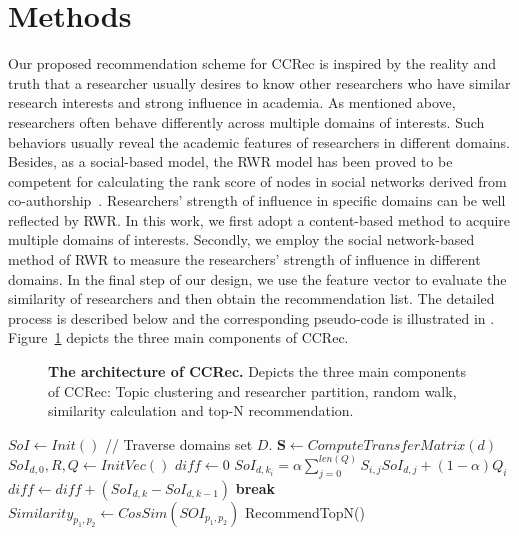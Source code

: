 \documentclass[10pt,letterpaper]{article}
\newcommand{\algorithmicbreak}{\textbf{break}}
\newcommand{\BREAK}{\State \algorithmicbreak}
\begin{document}
\section*{Methods}
Our proposed recommendation scheme for CCRec is inspired by the reality and truth that a researcher usually desires to know other researchers who have similar research interests and strong influence in academia. As mentioned above, researchers often behave differently across multiple domains of interests. Such behaviors usually reveal the academic features of researchers in different domains. Besides, as a social-based model, the RWR model has been proved to be competent for calculating the rank score of nodes in social networks derived from co-authorship~\cite{li2014acrec}. Researchers' strength of influence in specific domains can be well reflected by RWR. In this work, we first adopt a content-based method to acquire multiple domains of interests. Secondly, we employ the social network-based method of RWR to measure the researchers' strength of influence in different domains. In the final step of our design, we use the feature vector to evaluate the similarity of researchers and then obtain the recommendation list. The detailed process is described below and the corresponding pseudo-code is illustrated in . Figure~\ref{Fig. 1} depicts the three main components of CCRec.

\begin{figure}[!hbt]
\caption{{\bf The architecture of CCRec.} Depicts the three main components of CCRec: Topic clustering and researcher partition, random walk, similarity calculation and top-N recommendation.}
\label{Fig. 1}
\end{figure}

\begin{algorithm}[!hbt]
  \label{Algorithm1}
  \begin{algorithmic}[1]
  \State $SoI \leftarrow Init()$
   // Traverse domains set $D$.
        \State $\mathbf{S} \leftarrow ComputeTransferMatrix(d)$
        \State $SoI_{d,0}, R, Q \leftarrow InitVec()$
            \State $diff \leftarrow 0$
                \State $SoI_{d,k_{i}} = \alpha\sum_{j=0}^{len(Q)} S_{i,j}SoI_{d,j}+(1-\alpha) Q_{i}$
                \State $diff \leftarrow diff +(SoI_{d,k}-SoI_{d,k-1})$
            \EndFor
                \BREAK
            \EndIf
        \EndFor
  \EndFor
            \State $Similarity_{p_{1},p_{2}} \leftarrow CosSim(SOI_{p_{1},p_{2}})$
        \EndFor
  \EndFor
  \State RecommendTopN()
  \end{algorithmic}
\end{algorithm}
\end{document}
